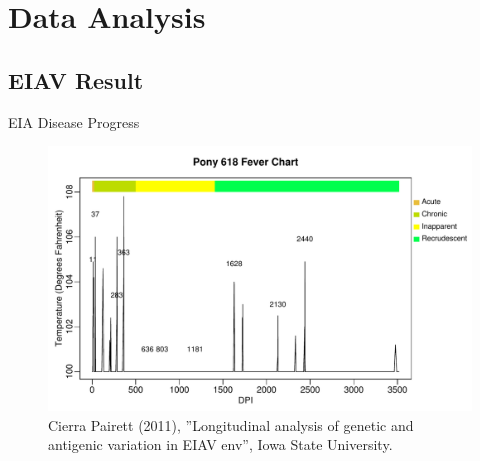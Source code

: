 \documentclass{beamer}
\begin{document}

\section{Data Analysis}

\subsection{EIAV Result}

\begin{frame}{EIA Disease Progress}

\vspace{-1.5cm}
\begin{center}
\hspace{-1.6cm}
\begin{figure}
  \includegraphics[width=4.5in]{./graph/fever_cycle}
  \\
  \vspace{-0.2cm}
  {\tiny Cierra Pairett (2011), ''Longitudinal analysis of genetic and antigenic
  variation in EIAV env'', Iowa State University.}
\end{figure}
\end{center}

\end{frame}

\end{document}
